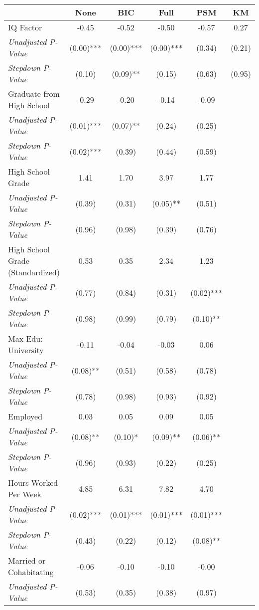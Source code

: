 \begin{tabular}{l c c c c c}
\toprule
 & None & BIC & Full & PSM & KM \\
\midrule
IQ Factor & -0.45 & -0.52 & -0.50 & -0.57 & 0.27 \\
\quad \textit{Unadjusted P-Value} & (0.00)*** & (0.00)*** & (0.00)*** & (0.34) & (0.21) \\
\quad \textit{Stepdown P-Value} & (0.10) & (0.09)** & (0.15) & (0.63) & (0.95) \\
Graduate from High School & -0.29 & -0.20 & -0.14 & -0.09 & \\
\quad \textit{Unadjusted P-Value} & (0.01)*** & (0.07)** & (0.24) & (0.25) & \\
\quad \textit{Stepdown P-Value} & (0.02)*** & (0.39) & (0.44) & (0.59) & \\
High School Grade & 1.41 & 1.70 & 3.97 & 1.77 & \\
\quad \textit{Unadjusted P-Value} & (0.39) & (0.31) & (0.05)** & (0.51) & \\
\quad \textit{Stepdown P-Value} & (0.96) & (0.98) & (0.39) & (0.76) & \\
High School Grade (Standardized) & 0.53 & 0.35 & 2.34 & 1.23 & \\
\quad \textit{Unadjusted P-Value} & (0.77) & (0.84) & (0.31) & (0.02)*** & \\
\quad \textit{Stepdown P-Value} & (0.98) & (0.99) & (0.79) & (0.10)** & \\
Max Edu: University & -0.11 & -0.04 & -0.03 & 0.06 & \\
\quad \textit{Unadjusted P-Value} & (0.08)** & (0.51) & (0.58) & (0.78) & \\
\quad \textit{Stepdown P-Value} & (0.78) & (0.98) & (0.93) & (0.92) & \\
Employed & 0.03 & 0.05 & 0.09 & 0.05 & \\
\quad \textit{Unadjusted P-Value} & (0.08)** & (0.10)* & (0.09)** & (0.06)** & \\
\quad \textit{Stepdown P-Value} & (0.96) & (0.93) & (0.22) & (0.25) & \\
Hours Worked Per Week & 4.85 & 6.31 & 7.82 & 4.70 & \\
\quad \textit{Unadjusted P-Value} & (0.02)*** & (0.01)*** & (0.01)*** & (0.01)*** & \\
\quad \textit{Stepdown P-Value} & (0.43) & (0.22) & (0.12) & (0.08)** & \\
Married or Cohabitating & -0.06 & -0.10 & -0.10 & -0.00 & \\
\quad \textit{Unadjusted P-Value} & (0.53) & (0.35) & (0.38) & (0.97) & \\

\end{tabular}
